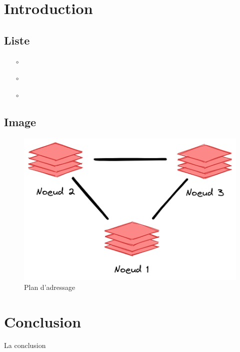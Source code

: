 \documentclass[12pt]{article}
\begin{document}
\tableofcontents
\newpage

\section{Introduction}
\subsection{Liste}

\begin{enumerate}
\item [$\circ$] 🍎
\item [$\circ$] 🍊
\item [$\circ$] 🥕
\end{enumerate}

\subsection{Image}

\begin{figure}[htp!]
  \centering
  \includegraphics[width=1\textwidth]{assets/screenshots/noeuds.png}
  \caption{Plan d'adressage}
  \label{fig:figure1}
\end{figure}

\section{Conclusion}

La conclusion
\end{document}
